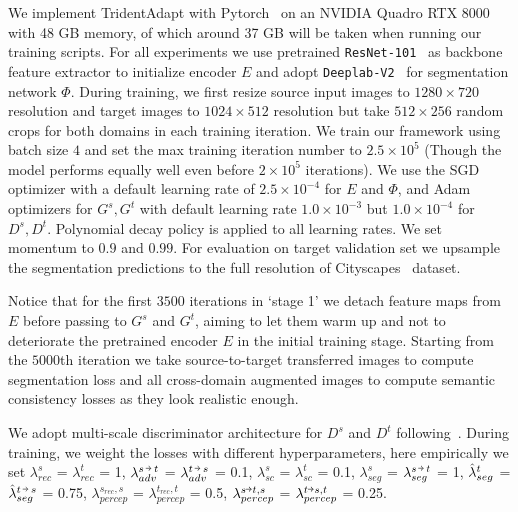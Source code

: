 \documentclass{bmvc2k}
\newcommand{\veryshortarrow}[1][3pt]{\mathrel{\hbox{\rule[\dimexpr\fontdimen22\textfont2-.2pt\relax]{#1}{.4pt}}\mkern-4mu\hbox{\usefont{U}{lasy}{m}{n}\symbol{41}}}}
\begin{document}
We implement TridentAdapt with Pytorch~\cite{NEURIPS2019_9015} on an NVIDIA Quadro RTX 8000 with 48 GB memory, of which around 37 GB will be taken when running our training scripts. For all experiments we use pretrained {\tt ResNet-101}~\cite{he2016deep} as backbone feature extractor to initialize encoder ${E}$ and adopt {\tt Deeplab-V2}~\cite{chen2017deeplab} for segmentation network ${\Phi}$. During training, we first resize source input images to $1280\times 720$ resolution and target images to $1024\times 512$ resolution but take $512\times 256$ random crops for both domains in each training iteration. We train our framework using batch size $4$ and set the max training iteration number to $2.5\times 10^{5}$ (Though the model performs equally well even before $2\times 10^{5}$ iterations). We use the SGD~\cite{robbins1951stochastic} optimizer with a default learning rate of $2.5\times 10^{-4}$ for ${E}$ and $\Phi$,  and Adam~\cite{adam:2015} optimizers for $G^{s}, G^{t}$ with default learning rate $1.0\times 10^{-3}$ but $1.0\times 10^{-4}$ for $D^{s}, D^{t}$. Polynomial decay policy is applied to all learning rates. We set momentum to $0.9$ and $0.99$. For evaluation on target validation set we upsample the segmentation predictions to the full resolution of Cityscapes~\cite{cordts2016cityscapes} dataset. 

Notice that for the first $3500$ iterations in `stage {1}' we detach feature maps from ${E}$ before passing to $G^{s}$ and $G^{t}$, aiming to let them warm up and not to deteriorate the pretrained encoder ${E}$ in the initial training stage. Starting from the $5000$th iteration we take source-to-target transferred images to compute segmentation loss and all cross-domain augmented images to compute semantic consistency losses as they look realistic enough. 

We adopt multi-scale discriminator architecture for $D^{s}$ and $D^{t}$ following~\cite{huang2018multimodal}.
During training, we weight the losses with different hyperparameters, here empirically we set $\lambda^{s}_{rec}$ =  $\lambda^{t}_{rec}$ = 1,  $\lambda^{s\,\veryshortarrow\,t}_{adv}$ = $\lambda^{t\,\veryshortarrow\,s}_{adv}$ = 0.1,  $\lambda^s_{sc}$ = $\lambda^t_{sc}$ = 0.1,  $\lambda^{s}_{seg}$ = $\lambda^{s\,\veryshortarrow\,t}_{seg}$ = 1, $\Hat{\lambda}^{t}_{seg}$ = $\Hat{\lambda}^{t\,\veryshortarrow\,s}_{seg}$ = 0.75, $\lambda^{s_{rec}, s}_{percep}$ = $\lambda^{t_{rec}, t}_{percep}$ = 0.5, $\lambda^{s\veryshortarrow t, s}_{percep}$ = $\lambda^{t\veryshortarrow s, t}_{percep}$ = 0.25.
\end{document}
